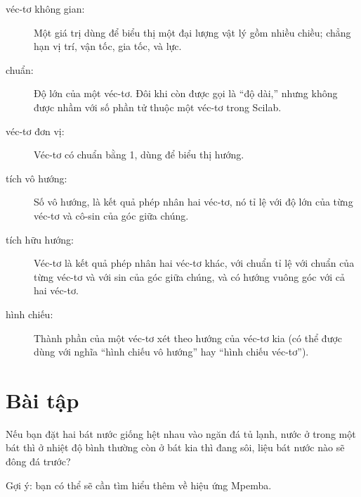 \documentclass[12pt]{book}
\begin{document}
\begin{description}

\item[véc-tơ không gian:] Một giá trị dùng để biểu thị một đại lượng
vật lý gồm nhiều chiều; chẳng hạn vị trí, vận tốc, gia tốc, và lực.

\item[chuẩn:] Độ lớn của một véc-tơ. Đôi khi còn được gọi là ``độ dài,''
nhưng không được nhầm với số phần tử thuộc một véc-tơ trong Scilab.

\item[véc-tơ đơn vị:] Véc-tơ có chuẩn bằng 1, dùng để biểu thị hướng.

\item[tích vô hướng:] Số vô hướng, là kết quả phép nhân hai véc-tơ, nó tỉ lệ với
độ lớn của từng véc-tơ và cô-sin của góc giữa chúng.

\item[tích hữu hướng:] Véc-tơ là kết quả phép nhân hai véc-tơ khác, với
chuẩn tỉ lệ với chuẩn của từng véc-tơ và với sin của góc giữa chúng,
và có hướng vuông góc với cả hai véc-tơ.

\item[hình chiếu:] Thành phần của một véc-tơ xét theo hướng của véc-tơ
kia (có thể được dùng với nghĩa ``hình chiếu vô hướng'' hay
``hình chiếu véc-tơ'').

\end{description}


\section{Bài tập}

\begin{ex}
Nếu bạn đặt hai bát nước giống hệt nhau vào ngăn đá tủ lạnh, nước ở
trong một bát thì ở nhiệt độ bình thường còn ở bát kia thì đang sôi, liệu
bát nước nào sẽ đông đá trước?

Gợi ý: bạn có thể sẽ cần tìm hiểu thêm về hiệu ứng Mpemba.

\end{ex}
\end{document}
